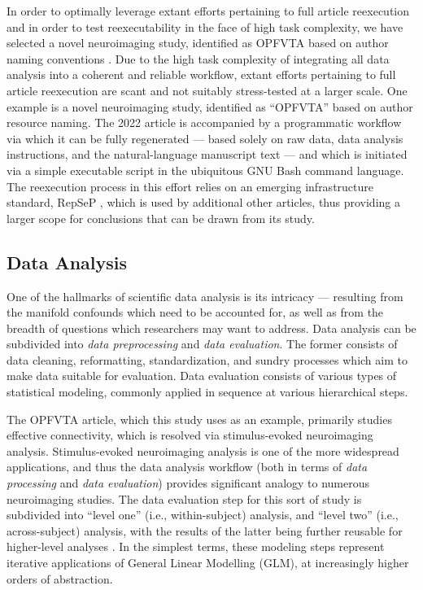 In order to optimally leverage extant efforts pertaining to full article reexecution and in order to test reexecutability in the face of high task complexity, we have selected a novel neuroimaging study, identified as OPFVTA based on author naming conventions \cite{opfvta}.
Due to the high task complexity of integrating all data analysis into a coherent and reliable workflow, extant efforts pertaining to full article reexecution are scant and not suitably stress-tested at a larger scale.
One example is a novel neuroimaging study, identified as “OPFVTA” \cite{opfvta} based on author resource naming.
The 2022 article is accompanied by a programmatic workflow via which it can be fully regenerated — based solely on raw data, data analysis instructions, and the natural-language manuscript text — and which is initiated via a simple executable script in the ubiquitous GNU Bash \cite{bash} command language.
The reexecution process in this effort relies on an emerging infrastructure standard, RepSeP \cite{repsep}, which is used by additional other articles, thus providing a larger scope for conclusions that can be drawn from its study.


\subsection{Data Analysis}

One of the hallmarks of scientific data analysis is its intricacy — resulting from the manifold confounds which need to be accounted for, as well as from the breadth of questions which researchers may want to address.
Data analysis can be subdivided into \emph{data preprocessing} and \emph{data evaluation}.
The former consists of data cleaning, reformatting, standardization, and sundry processes which aim to make data suitable for evaluation.
Data evaluation consists of various types of statistical modeling, commonly applied in sequence at various hierarchical steps.

The OPFVTA article, which this study uses as an example, primarily studies effective connectivity, which is resolved via stimulus-evoked neuroimaging analysis.
Stimulus-evoked neuroimaging analysis is one of the more widespread applications, and thus the data analysis workflow (both in terms of \emph{data processing} and \emph{data evaluation}) provides significant analogy to numerous neuroimaging studies.
The data evaluation step for this sort of study is subdivided into “level one” (i.e., within-subject) analysis, and “level two” (i.e., across-subject) analysis, with the results of the latter being further reusable for higher-level analyses \cite{Friston1995}.
In the simplest terms, these modeling steps represent iterative applications of General Linear Modelling (GLM), at increasingly higher orders of abstraction.

